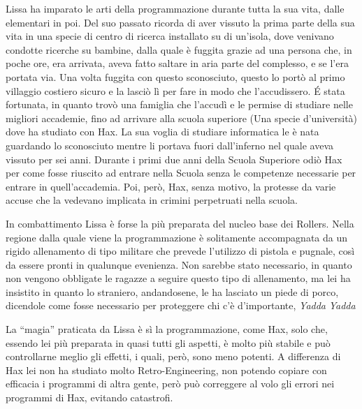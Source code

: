 \documentclass[9pt,a4paper,cleardoubleempty]{scrbook}
\begin{document}
        Lissa ha imparato le arti della programmazione durante tutta la sua
        vita, dalle elementari in poi. Del suo passato ricorda di aver
        vissuto la prima parte della sua vita in una specie di centro di
        ricerca installato su di un'isola, dove venivano condotte ricerche
        su bambine, dalla quale è fuggita grazie ad una persona che, in
        poche ore, era arrivata, aveva fatto saltare in aria parte del
        complesso, e se l'era portata via. Una volta fuggita con questo
        sconosciuto, questo lo portò al primo villaggio costiero sicuro e
        la lasciò lì per fare in modo che l'accudissero. \'E stata
        fortunata, in quanto trovò una famiglia che l'accudì e le permise
        di studiare nelle migliori accademie, fino ad arrivare alla scuola
        superiore (Una specie d'università) dove ha studiato con Hax. La
        sua voglia di studiare informatica le è nata guardando lo
        sconosciuto mentre li portava fuori dall'inferno nel quale aveva
        vissuto per sei anni. Durante i primi due anni della Scuola
        Superiore odiò Hax per come fosse riuscito ad entrare nella Scuola
        senza le competenze necessarie per entrare in quell'accademia. Poi,
        però, Hax, senza motivo, la protesse da varie accuse che la
        vedevano implicata in crimini perpetruati nella scuola.
        
        In combattimento Lissa è forse la più preparata del nucleo base dei
        Rollers. Nella regione dalla quale viene la programmazione è
        solitamente
        accompagnata da un rigido allenamento di tipo militare che prevede
        l'utilizzo di pistola e pugnale, così da essere pronti in qualunque
        evenienza. Non sarebbe stato necessario, in quanto non vengono
        obbligate le ragazze a seguire questo tipo di allenamento, ma lei
        ha insistito in quanto lo straniero, andandosene, le ha lasciato un
        piede di porco, dicendole come fosse necessario per proteggere chi
        c'è d'importante, \emph{Yadda} \emph{Yadda}

        La ``magia'' praticata da Lissa è sì la programmazione, come Hax,
        solo che, essendo lei più preparata in quasi tutti gli aspetti, è
        molto più stabile e può controllarne meglio gli effetti, i quali,
        però, sono meno potenti. A differenza di Hax lei non ha studiato
        molto Retro-Engineering, non potendo copiare con efficacia i
        programmi di altra gente, però può correggere al volo gli errori
        nei programmi di Hax, evitando catastrofi.
\end{document}

